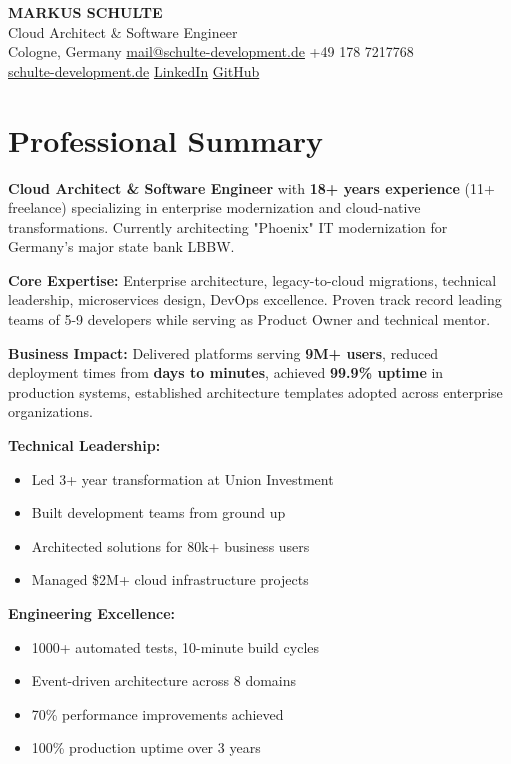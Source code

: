 \documentclass[10pt,a4paper]{article}
\begin{document}
{\centering
{\huge\bfseries\sffamily\color{darkblue} MARKUS SCHULTE}\\[4pt]
{\large\sffamily Cloud Architect \& Software Engineer}\\[6pt]
\textcolor{mediumgray}{
Cologne, Germany \textbar{} \href{mailto:mail@schulte-development.de}{mail@schulte-development.de} \textbar{} +49 178 7217768\\
\href{https://schulte-development.de}{schulte-development.de} \textbar{} \href{https://linkedin.com/in/markus-schulte}{LinkedIn} \textbar{} \href{https://github.com/SchulteDev}{GitHub}
}\\[8pt]
}

\section{Professional Summary}

\textbf{Cloud Architect \& Software Engineer} with \textbf{18+ years experience} (11+ freelance) specializing in enterprise modernization and cloud-native transformations. Currently architecting "Phoenix" IT modernization for Germany's major state bank LBBW.

\textbf{Core Expertise:} Enterprise architecture, legacy-to-cloud migrations, technical leadership, microservices design, DevOps excellence. Proven track record leading teams of 5-9 developers while serving as Product Owner and technical mentor.

\textbf{Business Impact:} Delivered platforms serving \textbf{9M+ users}, reduced deployment times from \textbf{days to minutes}, achieved \textbf{99.9\% uptime} in production systems, established architecture templates adopted across enterprise organizations.

\vspace{4pt}
\begin{minipage}[t]{0.48\textwidth}
\textbf{Technical Leadership:}
\begin{itemize}[leftmargin=12pt,itemsep=1pt]
\item Led 3+ year transformation at Union Investment
\item Built development teams from ground up
\item Architected solutions for 80k+ business users
\item Managed \$2M+ cloud infrastructure projects
\end{itemize}
\end{minipage}
\hfill
\begin{minipage}[t]{0.48\textwidth}
\textbf{Engineering Excellence:}
\begin{itemize}[leftmargin=12pt,itemsep=1pt]
\item 1000+ automated tests, 10-minute build cycles
\item Event-driven architecture across 8 domains
\item 70\% performance improvements achieved
\item 100\% production uptime over 3 years
\end{itemize}
\end{minipage}
\end{document}
